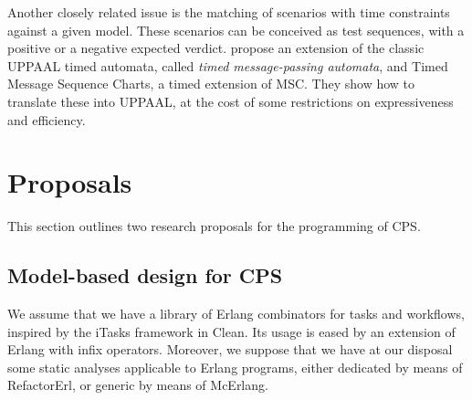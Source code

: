 \documentclass[a4paper,11pt,twoside]{article}
\newcommand\UPPAAL{\textsf{UPPAAL}\xspace}
\newcommand\McErlang{\textsf{McErlang}\xspace}
\newcommand\Erlang{\textsf{Erlang}\xspace}
\newcommand\RefactorErl{\textsf{RefactorErl}\xspace}
\newcommand\Clean{\textsf{Clean}\xspace}
\begin{document}
Another closely related issue is the matching of scenarios with time
constraints against a given model. These scenarios can be conceived as
test sequences, with a positive or a negative expected verdict.
\citet{ChandrasekaranMukund:2006} propose an extension of the classic
\UPPAAL timed automata, called \emph{timed message\hyp{}passing
  automata}, and Timed Message Sequence Charts, a timed extension of
MSC. They show how to translate these into \UPPAAL, at the cost of
some restrictions on expressiveness and efficiency.


\section{Proposals}

This section outlines two research proposals for the programming of
CPS.

\subsection{Model-based design for CPS}

We assume that we have a library of \Erlang combinators for tasks and
workflows, inspired by the \textsf{iTasks} framework in \Clean. Its
usage is eased by an extension of \Erlang with infix
operators. Moreover, we suppose that we have at our disposal some
static analyses applicable to \Erlang programs, either dedicated by
means of \RefactorErl, or generic by means of \McErlang.
\end{document}
